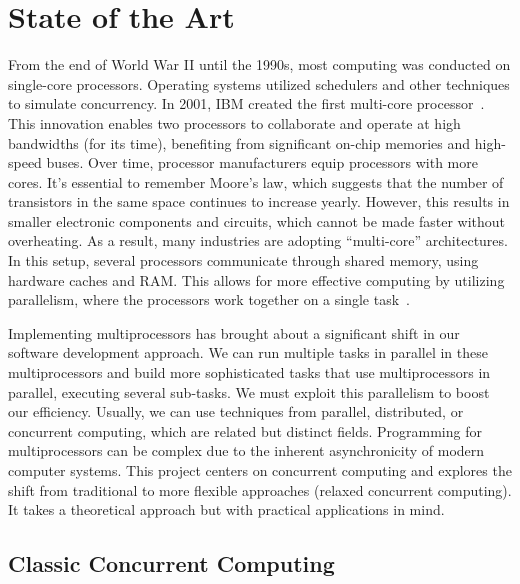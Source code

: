 \chapter{\label{chapter:2_State_of_art}State of the Art}

From the end of World War II until the 1990s, most computing was conducted on single-core processors. Operating systems utilized schedulers and other techniques to simulate concurrency. In 2001, IBM created the first multi-core processor~\cite{ibmIBM100Power}. This innovation enables two processors to collaborate and operate at high bandwidths (for its time), benefiting from significant on-chip memories and high-speed buses. Over time, processor manufacturers equip processors with more cores. It's essential to remember Moore's law, which suggests that the number of transistors in the same space continues to increase yearly. However, this results in smaller electronic components and circuits, which cannot be made faster without overheating. As a result, many industries are adopting ``multi-core'' architectures. In this setup, several processors communicate through shared memory, using hardware caches and RAM. This allows for more effective computing by utilizing parallelism, where the processors work together on a single task~\cite{DBLP_books_daglib_0020056}.

Implementing multiprocessors has brought about a significant shift in our software development approach. We can run multiple tasks in parallel in these multiprocessors and build more sophisticated tasks that use multiprocessors in parallel, executing several sub-tasks. We must exploit this parallelism to boost our efficiency. Usually, we can use techniques from parallel, distributed, or concurrent computing, which are related but distinct fields. Programming for multiprocessors can be complex due to the inherent asynchronicity of modern computer systems. This project centers on concurrent computing and explores the shift from traditional to more flexible approaches (relaxed concurrent computing). It takes a theoretical approach but with practical applications in mind.

\section{\label{section:classic-concurrent}Classic Concurrent Computing}

